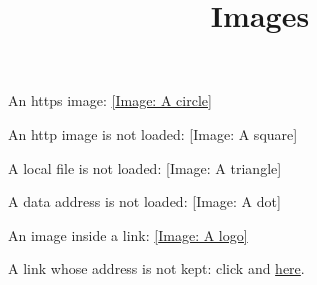 \documentclass{amsart}
\theoremstyle{definition}
\theoremstyle{remark}
\begin{document}
\title{Images}
\maketitle

An https image: \href{https://example.org/circle.png}{{[}Image: A circle]}

An http image is not loaded: {[}Image: A square]

A local file is not loaded: {[}Image: A triangle]

A data address is not loaded: {[}Image: A dot]

An image inside a link: \href{https://example.org}{\href{https://example.org/logo.png}{{[}Image: A logo]}}

A link whose address is not kept: click and \hyperref[tn-h-section]{here}.
\end{document}
